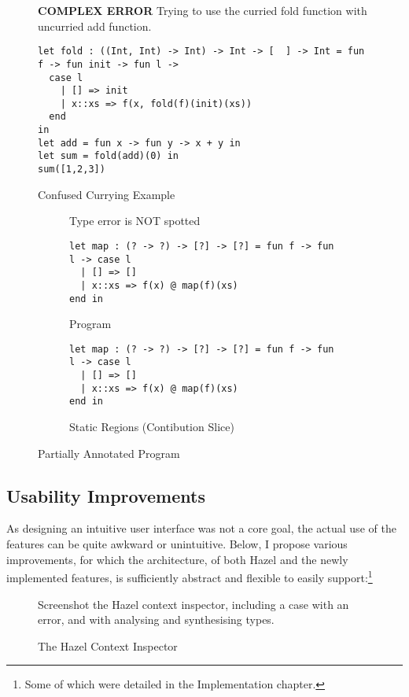 \begin{figure}
\textbf{COMPLEX ERROR}
Trying to use the curried fold function with uncurried add function.
\begin{lstlisting}
let fold : ((Int, Int) -> Int) -> Int -> [  ] -> Int = fun f -> fun init -> fun l -> 
  case l 
    | [] => init 
	| x::xs => f(x, fold(f)(init)(xs)) 
  end 
in
let add = fun x -> fun y -> x + y in
let sum = fold(add)(0) in
sum([1,2,3])
\end{lstlisting}
\caption{Confused Currying Example}
\label{fig:TastyCurry}
\end{figure}


\begin{figure}
\begin{subfigure}{.5\textwidth}
\centering
Type error is NOT spotted
\begin{lstlisting}
let map : (? -> ?) -> [?] -> [?] = fun f -> fun l -> case l 
  | [] => []
  | x::xs => f(x) @ map(f)(xs) 
end in   
\end{lstlisting}
\caption{Program}
\end{subfigure}

\begin{subfigure}{.5\textwidth}\centering
\begin{lstlisting}
let map : (? -> ?) -> [?] -> [?] = fun f -> fun l -> case l 
  | [] => []
  | x::xs => f(x) @ map(f)(xs) 
end in   
\end{lstlisting}
\caption{Static Regions (Contibution Slice)}
\end{subfigure}
\caption{Partially Annotated Program}
\label{fig:HalfAnnotated}
\end{figure}

\subsection{Usability Improvements}\label{sec:UIImprovements}
As designing an intuitive user interface was not a core goal, the actual use of the features can be quite awkward or unintuitive. Below, I propose various improvements, for which the architecture, of both Hazel and the newly implemented features, is sufficiently abstract and flexible to easily support:\footnote{Some of which were detailed in the Implementation chapter.}

\begin{figure}\centering
Screenshot the Hazel context inspector, including a case with an error, and with analysing and synthesising types.
\caption{The Hazel Context Inspector}
\label{fig:ContextInspector}
\end{figure}

